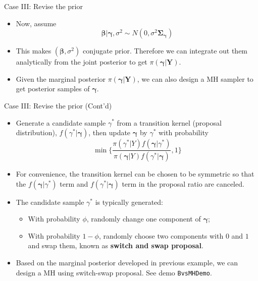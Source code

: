 \documentclass[10pt,mathserif]{beamer}
\begin{document}
\begin{frame}{Case III: Revise the prior}
    \begin{itemize}
        \item Now, assume
        \begin{equation*}
            \bm{\beta}|\bm{\gamma},\sigma^2 \sim N(0,\sigma^2\bm{\Sigma}_{\bm{\gamma}})
        \end{equation*}
        \item This makes $(\bm{\beta},\sigma^2)$ conjugate prior. Therefore we can integrate out them analytically from the joint posterior to get $\pi(\bm{\gamma}|\bm{Y})$.
        \item Given the marginal posterior $\pi(\bm{\gamma}|\bm{Y})$, we can also design a MH sampler to get posterior samples of $\bm{\gamma}$.        
    \end{itemize}
\end{frame}

\begin{frame}{Case III: Revise the prior (Cont'd)}
\begin{itemize}
        \item Generate a candidate sample $\gamma^*$ from a transition kernel (proposal distribution), $f(\gamma^*|\bm{\gamma})$, then update $\bm{\gamma}$ by $\gamma^*$ with probability
        \begin{equation*}
          \min\{\frac{\pi(\gamma^*|Y)f(\bm{\gamma}|\gamma^*)}{\pi(\bm{\gamma}|Y)f(\gamma^*|\bm{\gamma})},1 \}
        \end{equation*}
        \item  For convenience, the transition kernel can be chosen to be symmetric so that the $f(\bm{\gamma}|\gamma^*)$ term and $f(\gamma^*|\bm{\gamma})$ term in the proposal ratio are canceled.
        \item The candidate sample $\gamma^*$ is typically generated:
        \begin{itemize}
            \item With probability $\phi$, randomly change one component of $\bm{\gamma}$;
            \item With probability $1 - \phi$, randomly choose two components with $0$ and $1$ and swap them, known as \textbf{switch and swap proposal}.
        \end{itemize}
        \item Based on the marginal posterior developed in previous example, we can design a MH using switch-swap proposal. See demo \texttt{BvsMHDemo}.
    \end{itemize}
\end{frame}    
\end{document}
